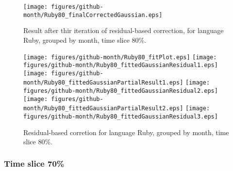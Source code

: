 \begin{figure}[]
\centering
{\texttt{[image: figures/github-month/Ruby80\_finalCorrectedGaussian.eps]}}
\caption{Result after thir iteration of residual-based correction, for language Ruby, grouped by month, time slice 80\%.}
\end{figure}


\begin{figure}[hb]
\centering
{}
{\texttt{[image: figures/github-month/Ruby80\_fitPlot.eps]}}
{\texttt{[image: figures/github-month/Ruby80\_fittedGaussianResidual1.eps]}}
{\texttt{[image: figures/github-month/Ruby80\_fittedGaussianPartialResult1.eps]}}
{\texttt{[image: figures/github-month/Ruby80\_fittedGaussianResidual2.eps]}}
{\texttt{[image: figures/github-month/Ruby80\_fittedGaussianPartialResult2.eps]}}
{\texttt{[image: figures/github-month/Ruby80\_fittedGaussianResidual3.eps]}}
\caption{Residual-based corretion for language Ruby, grouped by month, time slice 80\%.}
\end{figure}


\clearpage 
\newpage 


\FloatBarrier

\subsubsection{Time slice 70\%}


